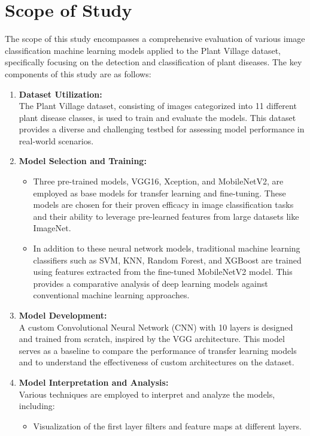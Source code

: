 \section{Scope of Study}
The scope of this study encompasses a comprehensive evaluation of various image classification machine learning models applied to the Plant Village dataset, specifically focusing on the detection and classification of plant diseases. The key components of this study are as follows:
\begin{enumerate}
    \item \textbf{Dataset Utilization:} \\
    The Plant Village dataset, consisting of images categorized into 11 different plant disease classes, is used to train and evaluate the models. This dataset provides a diverse and challenging testbed for assessing model performance in real-world scenarios.
    \item \textbf{Model Selection and Training:} 
    \begin{itemize}
        \item  Three pre-trained models, VGG16, Xception, and MobileNetV2, are employed as base models for transfer learning and fine-tuning. These models are chosen for their proven efficacy in image classification tasks and their ability to leverage pre-learned features from large datasets like ImageNet.
        \item In addition to these neural network models, traditional machine learning classifiers such as SVM, KNN, Random Forest, and XGBoost are trained using features extracted from the fine-tuned MobileNetV2 model. This provides a comparative analysis of deep learning models against conventional machine learning approaches.
    \end{itemize}
    \item \textbf{Model Development: }\\
    A custom Convolutional Neural Network (CNN) with 10 layers is designed and trained from scratch, inspired by the VGG architecture. This model serves as a baseline to compare the performance of transfer learning models and to understand the effectiveness of custom architectures on the dataset.
    \item \textbf{Model Interpretation and Analysis:} \\
    Various techniques are employed to interpret and analyze the models, including:
    \begin{itemize}
        \item Visualization of the first layer filters and feature maps at different layers.

\end{itemize}
\end{enumerate}
